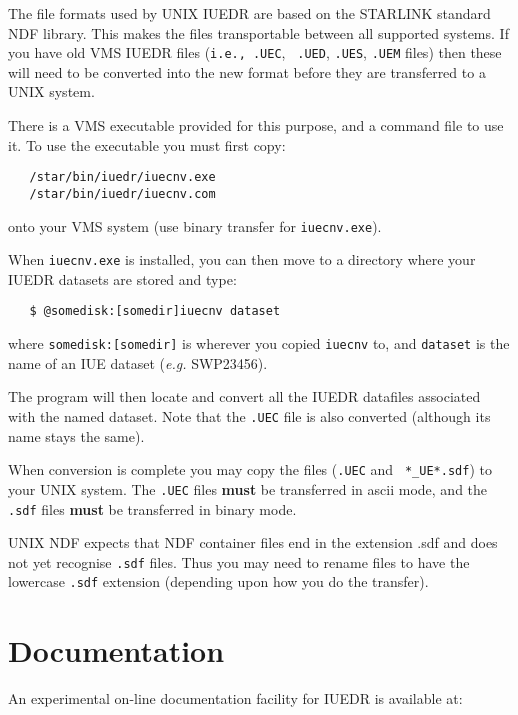 The file formats used by UNIX IUEDR are based on the STARLINK standard
NDF library. This makes the files transportable between all supported
systems. If you have old VMS IUEDR files ({\tt i.e.,}\ {\tt .UEC}, {\tt
.UED}, {\tt .UES}, {\tt .UEM} files) then these will need to be
converted into the new format before they are transferred to a UNIX
system.

There is a VMS executable provided for this purpose, and a command file
to use it. To use the executable you must first copy:

\begin{verbatim}
   /star/bin/iuedr/iuecnv.exe
   /star/bin/iuedr/iuecnv.com
\end{verbatim}

onto your VMS system (use binary transfer for {\tt iuecnv.exe}).

When {\tt iuecnv.exe} is installed, you can then move to a directory
where your IUEDR datasets are stored and type:

\begin{verbatim}
   $ @somedisk:[somedir]iuecnv dataset
\end{verbatim}

where {\tt somedisk:[somedir]} is wherever you copied {\tt iuecnv} to, and
{\tt dataset} is the name of an IUE dataset ({\it{e.g.}} SWP23456).

The program will then locate and convert all the IUEDR datafiles
associated with the named dataset. Note that the {\tt .UEC} file is also
converted (although its name stays the same).

When conversion is complete you may copy the files ({\tt .UEC} and {\tt
*\_UE*.sdf}) to your UNIX system. The {\tt .UEC} files {\bf must} be
transferred in ascii mode, and the {\tt .sdf} files {\bf must} be transferred
in binary mode.

UNIX NDF expects that NDF container files end in the extension .sdf and
does not yet recognise {\tt .sdf} files. Thus you may need to rename
files to have the lowercase {\tt .sdf} extension (depending upon how
you do the transfer).

\section {\label{se:documentation}Documentation}

An experimental on-line documentation facility for IUEDR is available
at:

